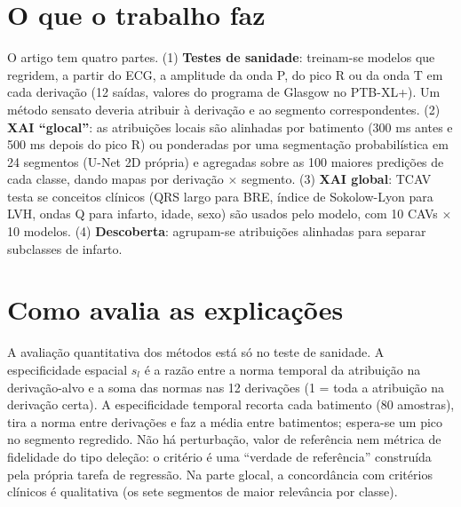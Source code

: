 \documentclass[11pt,a4paper]{article}
\begin{document}
\section{O que o trabalho faz}
O artigo tem quatro partes. (1) \textbf{Testes de sanidade}: treinam-se modelos que regridem, a partir do ECG, a amplitude da onda P, do pico R ou da onda T em cada derivação (12 saídas, valores do programa de Glasgow no PTB-XL+). Um método sensato deveria atribuir à derivação e ao segmento correspondentes. (2) \textbf{XAI “glocal”}: as atribuições locais são alinhadas por batimento (300 ms antes e 500 ms depois do pico R) ou ponderadas por uma segmentação probabilística em 24 segmentos (U-Net 2D própria) e agregadas sobre as 100 maiores predições de cada classe, dando mapas por derivação $\times$ segmento. (3) \textbf{XAI global}: TCAV testa se conceitos clínicos (QRS largo para BRE, índice de Sokolow-Lyon para LVH, ondas Q para infarto, idade, sexo) são usados pelo modelo, com 10 CAVs $\times$ 10 modelos. (4) \textbf{Descoberta}: agrupam-se atribuições alinhadas para separar subclasses de infarto.

\section{Como avalia as explicações}
A avaliação quantitativa dos métodos está só no teste de sanidade. A especificidade espacial $s_l$ é a razão entre a norma temporal da atribuição na derivação-alvo e a soma das normas nas 12 derivações (1 = toda a atribuição na derivação certa). A especificidade temporal recorta cada batimento (80 amostras), tira a norma entre derivações e faz a média entre batimentos; espera-se um pico no segmento regredido. Não há perturbação, valor de referência nem métrica de fidelidade do tipo deleção: o critério é uma “verdade de referência” construída pela própria tarefa de regressão. Na parte glocal, a concordância com critérios clínicos é qualitativa (os sete segmentos de maior relevância por classe).
\end{document}
